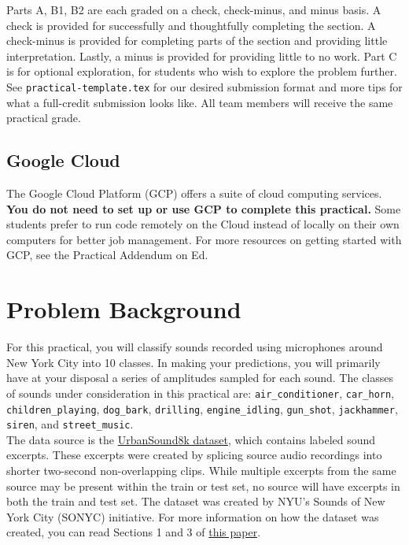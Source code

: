 \documentclass[12pt]{article}
\begin{document}
\noindent Parts A, B1, B2 are each graded on a check, check-minus, and minus basis. A check is provided for successfully and thoughtfully completing the section. A check-minus is provided for completing parts of the section and providing little interpretation. Lastly, a minus is provided for providing little to no work. Part C is for optional exploration, for students who wish to explore the problem further. \\

\noindent See \texttt{practical-template.tex} for our desired submission format and more tips for what a full-credit submission looks like.  All team members will receive the same practical grade.

\subsection{Google Cloud}

The Google Cloud Platform (GCP) offers a suite of cloud computing services.  \textbf{You do not need to set up or use GCP to complete this practical.}  Some students prefer to run code remotely on the Cloud instead of locally on their own computers for better job management. For more resources on getting started with GCP, see the Practical Addendum on Ed.



\section{Problem Background}\label{section:problem-background}
For this practical, you will classify sounds recorded using microphones around New York City into 10 classes. In making your predictions, you will primarily have at your disposal a series of amplitudes sampled for each sound. The classes of sounds under consideration in this practical are: \texttt{air\_conditioner}, \texttt{car\_horn}, \texttt{children\_playing}, \texttt{dog\_bark}, \texttt{drilling}, \texttt{engine\_idling}, \texttt{gun\_shot}, \texttt{jackhammer}, \texttt{siren}, and \texttt{street\_music}.\\ 

\noindent The data source is the \href{https://urbansounddataset.weebly.com/urbansound8k.html}{UrbanSound8k dataset}, which contains labeled sound excerpts. These excerpts were created by splicing source audio recordings into shorter two-second non-overlapping clips. While multiple excerpts from the same source may be present within the train or test set, no source will have excerpts in both the train and test set.  The dataset was created by NYU's Sounds of New York City (SONYC) initiative.  For more information on how the dataset was created, you can read Sections 1 and 3 of \href{http://www.justinsalamon.com/uploads/4/3/9/4/4394963/salamon_urbansound_acmmm14.pdf}{this paper}.  
\end{document}
